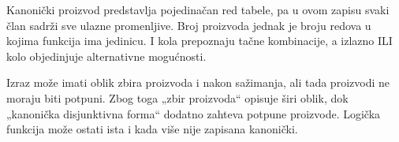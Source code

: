 
Kanonički proizvod predstavlja pojedinačan red tabele, pa u ovom zapisu svaki član sadrži sve ulazne promenljive. Broj proizvoda jednak je broju redova u kojima funkcija ima jedinicu. I kola prepoznaju tačne kombinacije, a izlazno ILI kolo objedinjuje alternativne mogućnosti.

Izraz može imati oblik zbira proizvoda i nakon sažimanja, ali tada proizvodi ne moraju biti potpuni. Zbog toga „zbir proizvoda“ opisuje širi oblik, dok „kanonička disjunktivna forma“ dodatno zahteva potpune proizvode. Logička funkcija može ostati ista i kada više nije zapisana kanonički.
